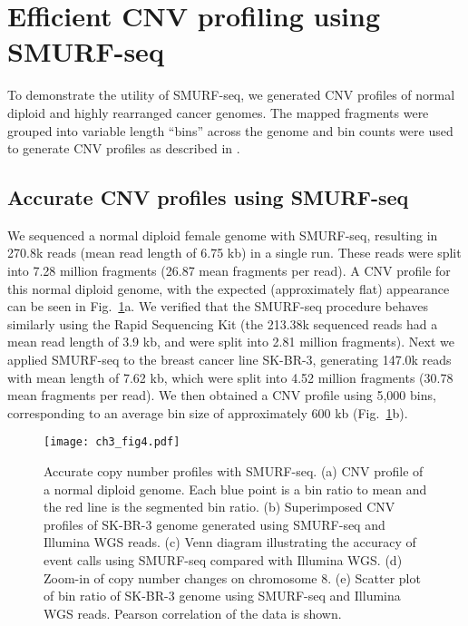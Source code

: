 \section{Efficient CNV profiling using SMURF-seq}
To demonstrate the utility of SMURF-seq, we generated CNV profiles of
normal diploid and highly rearranged cancer genomes.  The mapped
fragments were grouped into variable length ``bins'' across the genome
and bin counts were used to generate CNV profiles as described in
\citep{baslan2012genome,kendall2014computational}.

\subsection{Accurate CNV profiles using SMURF-seq}
We sequenced a normal diploid female genome with SMURF-seq, resulting in
270.8k reads (mean read length of 6.75 kb) in a single run. These reads
were split into 7.28 million fragments (26.87 mean fragments per read).
A CNV profile for this normal diploid genome, with the expected
(approximately flat) appearance can be seen in Fig.~\ref{cnv}a.  We
verified that the SMURF-seq procedure behaves similarly using the Rapid
Sequencing Kit (the 213.38k sequenced reads had a mean read length of
3.9 kb, and were split into 2.81 million fragments).  Next we applied
SMURF-seq to the breast cancer line SK-BR-3, generating 147.0k reads
with mean length of 7.62 kb, which were split into 4.52 million
fragments (30.78 mean fragments per read). We then obtained a CNV
profile using 5,000 bins, corresponding to an average bin size of
approximately 600 kb (Fig.~\ref{cnv}b).

\begin{figure}[b!]
\centering
\texttt{[image: ch3\_fig4.pdf]}
\caption{Accurate copy number profiles with SMURF-seq.
  (a) CNV profile of a normal diploid genome. Each blue point is a
  bin ratio to mean and the red line is the segmented bin ratio.
  (b) Superimposed CNV profiles of SK-BR-3 genome generated using SMURF-seq
  and Illumina WGS reads.
  (c) Venn diagram illustrating the accuracy of event calls using SMURF-seq
  compared with Illumina WGS.
  (d) Zoom-in of copy number changes on chromosome 8.
  (e) Scatter plot of bin ratio of SK-BR-3 genome using
  SMURF-seq and Illumina WGS reads. Pearson correlation of the data is shown.}
\label{cnv}
\end{figure}

